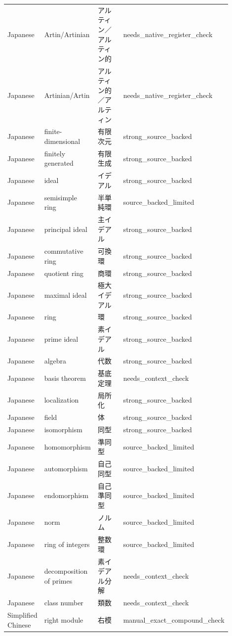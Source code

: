 \documentclass{article}
\begin{document}
\begin{longtable}{p{0.16\linewidth}p{0.22\linewidth}p{0.28\linewidth}p{0.24\linewidth}}
Japanese & Artin/Artinian & アルティン／アルティン的 & needs\_native\_register\_check \\
Japanese & Artinian/Artin & アルティン的／アルティン & needs\_native\_register\_check \\
Japanese & finite-dimensional & 有限次元 & strong\_source\_backed \\
Japanese & finitely generated & 有限生成 & strong\_source\_backed \\
Japanese & ideal & イデアル & strong\_source\_backed \\
Japanese & semisimple ring & 半単純環 & source\_backed\_limited \\
Japanese & principal ideal & 主イデアル & strong\_source\_backed \\
Japanese & commutative ring & 可換環 & strong\_source\_backed \\
Japanese & quotient ring & 商環 & strong\_source\_backed \\
Japanese & maximal ideal & 極大イデアル & strong\_source\_backed \\
Japanese & ring & 環 & strong\_source\_backed \\
Japanese & prime ideal & 素イデアル & strong\_source\_backed \\
Japanese & algebra & 代数 & strong\_source\_backed \\
Japanese & basis theorem & 基底定理 & needs\_context\_check \\
Japanese & localization & 局所化 & strong\_source\_backed \\
Japanese & field & 体 & strong\_source\_backed \\
Japanese & isomorphism & 同型 & strong\_source\_backed \\
Japanese & homomorphism & 準同型 & source\_backed\_limited \\
Japanese & automorphism & 自己同型 & source\_backed\_limited \\
Japanese & endomorphism & 自己準同型 & source\_backed\_limited \\
Japanese & norm & ノルム & source\_backed\_limited \\
Japanese & ring of integers & 整数環 & source\_backed\_limited \\
Japanese & decomposition of primes & 素イデアル分解 & needs\_context\_check \\
Japanese & class number & 類数 & needs\_context\_check \\
Simplified Chinese & right module & 右模 & manual\_exact\_compound\_check \\

\end{longtable}
\end{document}
